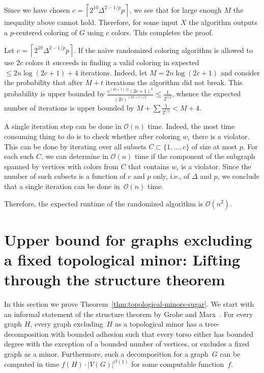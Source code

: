 \documentclass[11pt]{article}
\begin{document}
Since we have chosen $c=\left\lceil2^{10}\Delta^{2-1/p}p\right\rceil$, 
we see that for large enough
$M$ the inequality above cannot hold.
Therefore, for some input $X$ the algorithm outputs a
$p$-centered coloring of $G$ using $c$ colors.
This completes the proof. 

\medskip

Let $c=\left\lceil2^{10}\Delta^{2-1/p}p\right\rceil$. 
If the naïve randomized coloring algorithm
is allowed to use $2c$ colors it succeeds in finding a valid coloring
in expected $\leq 2n\log(2c+1) + 4$ iterations.
Indeed, let $M=2n\log(2c+1)$ and consider the probability that
after $M+t$ iterations the algorithm did not break. This probability
is upper bounded by
$\frac{c^{(M+t)/2}(2c+1)^{n}}{(2c)^{(M+t)/2}}\leq\frac{1}{2^{t/2}}$,
whence the expected number of iterations is upper bounded by
$M + \sum \frac{1}{2^{t/2}} < M+4$. 

A single iteration step can be done in $\mathcal{O}(n)$ time.  Indeed, the most time
consuming thing to do is to check whether after coloring $w_i$
there is a violator. This can be done by iterating over all subsets
$C\subset\{1,\ldots,c\}$ of size at most $p$.  For each such $C$, we can
determine in $\mathcal{O}(n)$ time if the component of the subgraph spanned by
vertices with colors from $C$ that contains $w_i$ is a violator.  Since the
number of such subsets is a function of $c$ and $p$ only, i.e., of $\Delta$
and $p$, we conclude that a single iteration can be done in~$\mathcal{O}(n)$ time.

Therefore, the expected runtime of the randomized algorithm is $\mathcal{O}(n^2)$.


\section{Upper bound for graphs excluding a fixed topological minor: 
Lifting through the structure theorem}
\label{sec-lifting}


In this section we prove Theorem~\ref{thm:topological-minors-sugar}.
We start with an informal statement of the structure theorem by Grohe
and Marx~\cite{GM15}.  For every graph $H$, every graph excluding~$H$
as a topological minor has a tree-decomposition with bounded adhesion
such that every torso either has bounded degree with the exception
of a bounded number of vertices, or excludes a fixed graph as a
minor.  Furthermore, such a decomposition for a graph~$G$ can be
computed in time $f(H)\cdot|V(G)|^{\mathcal{O}(1)}$ for some computable
function~$f$.
\end{document}
